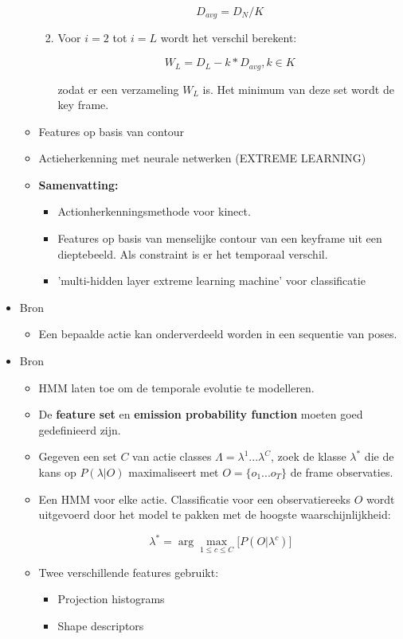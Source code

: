 \begin{itemize}
\begin{itemize}
\begin{enumerate}
			$$D_{avg} = D_N / K$$
			
			\item Voor $i = 2$ tot $i = L$ wordt het verschil berekent:
			
			$$W_L = D_L - k * D_{avg}, k \in K$$
			
			zodat er een verzameling ${W_L}$ is. Het minimum van deze set wordt de key frame.
		\end{enumerate}
		\item Features op basis van contour
		\item Actieherkenning met neurale netwerken (EXTREME LEARNING)
		\item \textbf{Samenvatting:}
		\begin{itemize}
			\item Actionherkenningsmethode voor kinect.
			\item Features op basis van menselijke contour van een keyframe uit een dieptebeeld. Als constraint is er het temporaal verschil.
			\item 'multi-hidden layer extreme learning machine' voor classificatie
		
		\end{itemize}
		
	\end{itemize}

	\item Bron \cite{Carlsson2001}
	\begin{itemize}
		\item Een bepaalde actie kan onderverdeeld worden in een sequentie van poses.
	\end{itemize}	

	\item Bron \cite{Vezzani2010}
	\begin{itemize}
		\item HMM laten toe om de temporale evolutie te modelleren.
		\item De \textbf{feature set} en \textbf{emission probability function} moeten goed gedefinieerd zijn. 
		\item Gegeven een set $C$ van actie classes $\Lambda = \lambda^1 ... \lambda^C$, zoek de klasse $\lambda^*$ die de kans op $P(\lambda|O)$ maximaliseert met $O = \{o_1 ... o_T\}$ de frame observaties.
		\item Een HMM voor elke actie. Classificatie voor een observatiereeks $O$ wordt uitgevoerd door het model te pakken met de hoogste waarschijnlijkheid:
		
				
		$$\lambda^* = \arg \max_{1\leq c\leq C} \big[P(O|\lambda^c)\big]$$
		\item Twee verschillende features gebruikt:
		\begin{itemize}
			\item Projection histograms
			\item Shape descriptors
		\end{itemize}
	\end{itemize}
\end{itemize}



